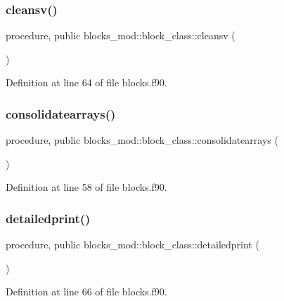 \subsubsection{\texorpdfstring{cleansv()}{cleansv()}}
{\footnotesize\ttfamily procedure, public blocks\+\_\+mod\+::block\+\_\+class\+::cleansv (\begin{DoxyParamCaption}{ }\end{DoxyParamCaption})}



Definition at line 64 of file blocks.\+f90.

\mbox{\label{structblocks__mod_1_1block__class_a68f5bb0cb32b5b51cffd66d472cc45f0}} 
\subsubsection{\texorpdfstring{consolidatearrays()}{consolidatearrays()}}
{\footnotesize\ttfamily procedure, public blocks\+\_\+mod\+::block\+\_\+class\+::consolidatearrays (\begin{DoxyParamCaption}{ }\end{DoxyParamCaption})}



Definition at line 58 of file blocks.\+f90.

\mbox{\label{structblocks__mod_1_1block__class_a937d8dca8393460bc718dafa8a5c03ac}} 
\subsubsection{\texorpdfstring{detailedprint()}{detailedprint()}}
{\footnotesize\ttfamily procedure, public blocks\+\_\+mod\+::block\+\_\+class\+::detailedprint (\begin{DoxyParamCaption}{ }\end{DoxyParamCaption})}



Definition at line 66 of file blocks.\+f90.

